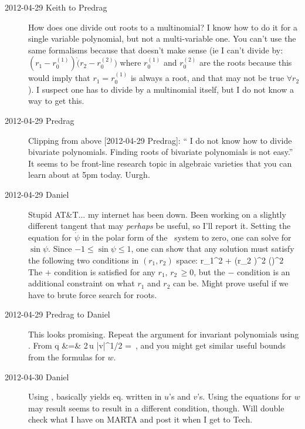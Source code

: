 \begin{description}
\item[2012-04-29 Keith to Predrag] How does one divide out roots
to a multinomial?  I know how to do it for a single variable polynomial,
but not a multi-variable one.  You can't use the same formalisms because
that doesn't make sense (ie I can't divide by:
$(r_1-r_{0}^{(1)})\dot(r_2-r_{0}^{(2)})$ where $r_{0}^{(1)}$ and
$r_{0}^{(2)}$ are the roots because this would imply that $r_1 =
r_{0}^{(1)}$ is always a root, and that may not be true $\forall r_2$).
I suspect one has to divide by a multinomial itself, but I do not know a
way to get this.

\item[2012-04-29 Predrag] Clipping from above [2012-04-29 Predrag]: `` I
do not know how to divide bivariate polynomials. Finding roots of
bivariate polynomials is not easy.'' It seems to be front-line research
topic in algebraic varieties that you can learn about at 5pm today.
Uurgh.

\item[2012-04-29 Daniel] Stupid AT\&T... my internet has been down. Been
working on a slightly different tangent that may \emph{perhaps} be
useful, so I'll report it. Setting the equation for $\dot{\psi}$ in the
polar form of the \twoMode\ system to zero, one can solve for
$\sin{\psi}$. Since $-1 \leq \sin{\psi}\leq 1$, one can show that any
solution must satisfy the following two conditions in $(r_1,r_2)$ space:
\beq
{}r_1^2 + \left(r_2 \pm {}\right)^2
  \geq \left(\right)^2
The $+$ condition is satisfied for any $r_1,\,r_2\,\geq 0$, but the $-$
condition is an additional constraint on what $r_1$ and $r_2$ can be.
Might prove useful if we have to brute force search for roots.

\item[2012-04-29 Predrag to Daniel] This looks promising. Repeat the
argument for invariant polynomials using .
From 
\bea
  q &=&  2\,u |v|^{1/2} \sin \psi = 
  \,,
\label{PKinvEqs7}
\eea
and you might get similar useful bounds from the formulas for $w$.

\item[2012-04-30 Daniel] Using , basically yields eq.
 written in $u$'s and $v$'s. Using the equations for
$w$ may result seems to result in a different condition, though. Will
double check what I have on MARTA and post it when I get to Tech.


\end{description}
